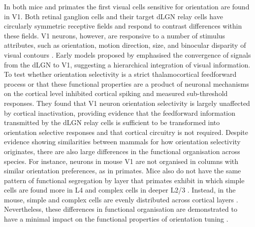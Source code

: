 \documentclass[12pt]{article}
\begin{document}
In both mice and primates the first visual cells sensitive for orientation are found in V1. Both retinal ganglion cells and their target dLGN relay cells have circularly symmetric receptive fields and respond to contrast differences within these fields. V1 neurons, however, are responsive to a number of stimulus attributes, such as orientation, motion direction, size, and binocular disparity of visual contours \autocite{hubelReceptiveFieldsBinocular1962}. Early models proposed by \textcite{hubelReceptiveFieldsBinocular1962} emphasised the convergence of signals from the dLGN to V1, suggesting a hierarchical integration of visual information. To test whether orientation selectivity is a strict thalamocortical feedforward process or that these functional properties are a product of neuronal mechanisms on the cortical level \textcite{fersterOrientationSelectivityThalamic1996} inhibited cortical spiking and measured sub-threshold responses. They found that V1 neuron orientation selectivity is largely unaffected by cortical inactivation, providing evidence that the feedforward information transmitted by the dLGN relay cells is sufficient to be transformed into orientation selective responses and that cortical circuitry is not required. Despite evidence showing similarities between mammals for how orientation selectivity originates, there are also large differences in the functional organisation across species. For instance, neurons in mouse V1 are not organised in columns with similar orientation preferences, as in primates. Mice also do not have the same pattern of functional segregation by layer that primates exhibit in which simple cells are found more in L4 and complex cells in deeper L2/3 \autocite{martinezReceptiveFieldStructure2005}. Instead, in the mouse, simple and complex cells are evenly distributed across cortical layers \autocite{niellHighlySelectiveReceptive2008}. Nevertheless, these differences in functional organisation are demonstrated to have a minimal impact on the functional properties of orientation tuning \autocite{hooserOrientationSelectivityOrientation2005}. 
\end{document}
